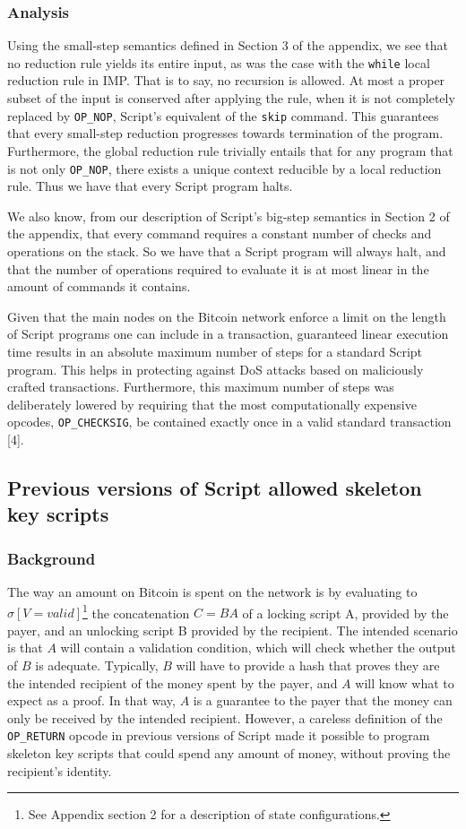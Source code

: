 \documentclass[letterpaper, 10 pt, conference]{ieeeconf}
\begin{document}
\subsubsection{Analysis}
Using the small-step semantics defined in Section 3 of the appendix, we see that no reduction rule yields its entire input, as was the case with the \texttt{while} local reduction rule in IMP. That is to say, no recursion is allowed. At most a proper subset of the input is conserved after applying the rule, when it is not completely replaced by \texttt{OP\_NOP}, Script's equivalent of the \texttt{skip} command. This guarantees that every small-step reduction progresses towards termination of the program. Furthermore, the global reduction rule trivially entails that for any program that is not only \texttt{OP\_NOP}, there exists a unique context reducible by a local reduction rule. Thus we have that every Script program halts.

We also know, from our description of Script's big-step semantics in Section 2 of the appendix, that every command requires a constant number of checks and operations on the stack. So we have that a Script program will always halt, and that the number of operations required to evaluate it is at most linear in the amount of commands it contains.

Given that the main nodes on the Bitcoin network enforce a limit on the length of Script programs one can include in a transaction, guaranteed linear execution time results in an absolute maximum number of steps for a standard Script program. This helps in protecting against DoS attacks based on maliciously crafted transactions. Furthermore, this maximum number of steps was deliberately lowered by requiring that the most computationally expensive opcodes, \texttt{OP\_CHECKSIG}, be contained exactly once in a valid standard transaction [4].


\subsection{Previous versions of Script allowed skeleton key scripts}

\subsubsection{Background}
The way an amount on Bitcoin is spent on the network is by evaluating to $\sigma[V=valid]$\footnote{See Appendix section 2 for a description of state configurations.} the concatenation $C = BA$ of a locking script A, provided by the payer, and an unlocking script B provided by the recipient. The intended scenario is that $A$ will contain a validation condition, which will check whether the output of $B$ is adequate. Typically, $B$ will have to provide a hash that proves they are the intended recipient of the money spent by the payer, and $A$ will know what to expect as a proof. In that way, $A$ is a guarantee to the payer that the money can only be received by the intended recipient. However, a careless definition of the \texttt{OP\_RETURN} opcode in previous versions of Script made it possible to program skeleton key scripts that could spend any amount of money, without proving the recipient's identity.
\end{document}
